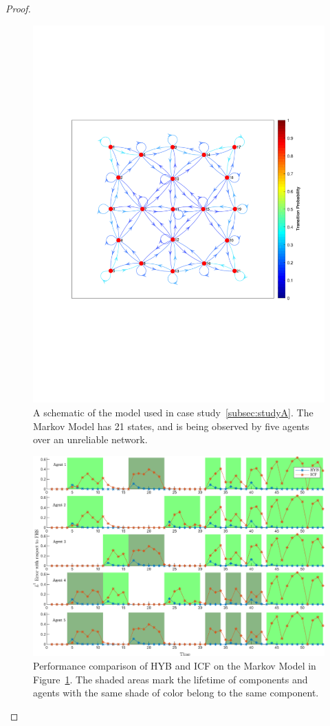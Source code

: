 \documentclass[journal]{IEEEtran}
\theoremstyle{remark}
\theoremstyle{definition}
\begin{document}
\begin{proof}
\begin{figure}[b]
\includegraphics[width=\columnwidth]{./CaseA_MarkovChain_SmallChessboard.pdf}
\caption{A schematic of the model used in case study~\ref{subsec:studyA}.
The Markov Model has 21 states, and is being observed by five agents over an
unreliable network.}
\label{fig:c1a}
\end{figure}

\begin{figure}
	\includegraphics[width=\linewidth]{./CaseA_L1_SmallChessboard.pdf}
\caption{Performance comparison of HYB and ICF on the Markov Model in
Figure~\ref{fig:c1a}.  The shaded areas mark the lifetime of components and
agents with the same shade of color belong to the same component. }
\label{fig:c1b}
\end{figure}






\end{proof}
\end{document}
